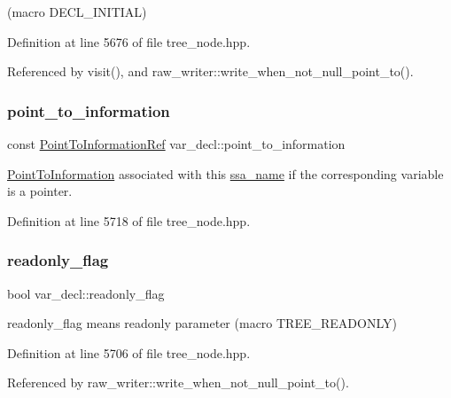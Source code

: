 (macro D\+E\+C\+L\+\_\+\+I\+N\+I\+T\+I\+AL) 

Definition at line 5676 of file tree\+\_\+node.\+hpp.



Referenced by visit(), and raw\+\_\+writer\+::write\+\_\+when\+\_\+not\+\_\+null\+\_\+point\+\_\+to().

\mbox{\label{structvar__decl_a1a9d73d52836a861625c3562ca95bcfa}} 
\subsubsection{\texorpdfstring{point\+\_\+to\+\_\+information}{point\_to\_information}}
{\footnotesize\ttfamily const \hyperlink{tree__node_8hpp_aa7470417b67a13b20fb980e600e55d8d}{Point\+To\+Information\+Ref} var\+\_\+decl\+::point\+\_\+to\+\_\+information}



\hyperlink{structPointToInformation}{Point\+To\+Information} associated with this \hyperlink{structssa__name}{ssa\+\_\+name} if the corresponding variable is a pointer. 



Definition at line 5718 of file tree\+\_\+node.\+hpp.

\mbox{\label{structvar__decl_aafdd8d92e8291c153d7af1618c421da0}} 
\subsubsection{\texorpdfstring{readonly\+\_\+flag}{readonly\_flag}}
{\footnotesize\ttfamily bool var\+\_\+decl\+::readonly\+\_\+flag}



readonly\+\_\+flag means readonly parameter (macro T\+R\+E\+E\+\_\+\+R\+E\+A\+D\+O\+N\+LY) 



Definition at line 5706 of file tree\+\_\+node.\+hpp.



Referenced by raw\+\_\+writer\+::write\+\_\+when\+\_\+not\+\_\+null\+\_\+point\+\_\+to().

